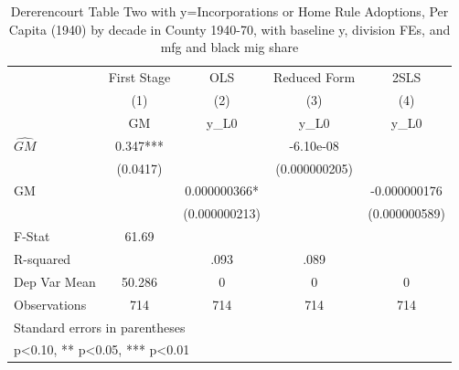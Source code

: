 \begin{table}[htbp]\centering
\def\sym#1{\ifmmode^{#1}\else\(^{#1}\)\fi}
\caption{Dererencourt Table Two with y=Incorporations or Home Rule Adoptions, Per Capita (1940) by decade in County 1940-70, with baseline y, division FEs, and mfg and black mig share}
\begin{tabular}{l*{4}{c}}
\toprule
                    & First Stage   &         OLS   &Reduced Form   &        2SLS   \\
                    &\multicolumn{1}{c}{(1)}&\multicolumn{1}{c}{(2)}&\multicolumn{1}{c}{(3)}&\multicolumn{1}{c}{(4)}\\
                    &\multicolumn{1}{c}{GM}&\multicolumn{1}{c}{y\_L0}&\multicolumn{1}{c}{y\_L0}&\multicolumn{1}{c}{y\_L0}\\
\midrule
$\hat{GM}$          &       0.347***&               &   -6.10e-08   &               \\
                    &    (0.0417)   &               &(0.000000205)   &               \\
\addlinespace
GM                  &               & 0.000000366*  &               &-0.000000176   \\
                    &               &(0.000000213)   &               &(0.000000589)   \\
\midrule
F-Stat              &       61.69   &               &               &               \\
R-squared           &               &        .093   &        .089   &               \\
Dep Var Mean        &      50.286   &           0   &           0   &           0   \\
Observations        &         714   &         714   &         714   &         714   \\
\bottomrule
\multicolumn{5}{l}{\footnotesize Standard errors in parentheses}\\
\multicolumn{5}{l}{\footnotesize * p<0.10, ** p<0.05, *** p<0.01}\\
\end{tabular}
\end{table}
